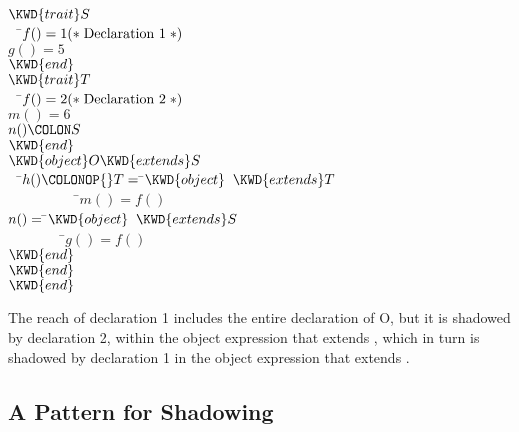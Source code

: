 %
%
\begin{Fortress}
\(\KWD{trait} S\)\\
{\tt~~}\pushtabs\=\+\(  f() = 1  \mathtt{(*}\;\hbox{\rm  Declaration 1 \unskip}\;\mathtt{*)}\)\\
\(  g() = 5\)\-\\\poptabs
\(\KWD{end}\)\\[4pt]
\(\KWD{trait} T\)\\
{\tt~~}\pushtabs\=\+\(  f() = 2  \mathtt{(*}\;\hbox{\rm  Declaration 2 \unskip}\;\mathtt{*)}\)\\
\(  m() = 6\)\\
\(  n()\COLON S\)\-\\\poptabs
\(\KWD{end}\)\\[4pt]
\(\KWD{object} O \KWD{extends} S\)\\
{\tt~~}\pushtabs\=\+\(  h()\COLONOP{}T = \null\)\pushtabs\=\+\(\KWD{object}\;\;\KWD{extends} T\)\\
{\tt~~~~~~~~~~}\pushtabs\=\+\(            m() = f()\)\\
\(            n() = \null\)\pushtabs\=\+\(\KWD{object}\;\;\KWD{extends} S\)\\
{\tt~~~~~~~~}\pushtabs\=\+\(                    g() = f()\)\-\\\poptabs
\(                  \KWD{end}\)\-\-\\\poptabs\poptabs
\(          \KWD{end}\)\-\-\\\poptabs\poptabs
\(\KWD{end}\)
\end{Fortress}

The reach of declaration 1
includes the entire declaration of O,
but it is shadowed by declaration 2,
within the object expression that extends ,
which in turn is shadowed by declaration 1
in the object expression that extends .

\subsection{A Pattern for Shadowing}



